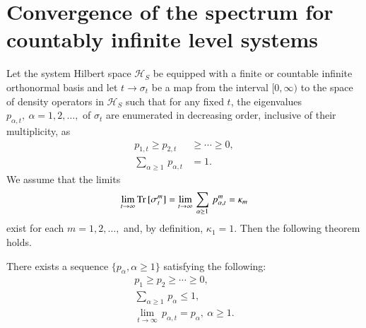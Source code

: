 \section{Convergence of the spectrum for countably infinite level systems}\label{chap8-sec9}

Let the system Hilbert space $\mathcal{H}_S$ be equipped with a finite or countable infinite orthonormal basis and let 
$t\rightarrow \sigma_t$ be a map from the interval $[0,\infty)$ to the space of density operators in $\mathcal{H}_S$ such that for any fixed  $t$, the eigenvalues $p_{\alpha, t},\ \alpha=1,2,\ldots,$  of  
$\sigma_t$ are enumerated in decreasing order, inclusive of their multiplicity, as   
\begin{align} 
p_{1,t}\geq p_{2,t}& \geq \cdots \geq 0, \label{chap8-eq9.1}\\
\sum_{\alpha\geq 1}\, p_{\alpha, t}& =1.\label{chap8-eq9.2}
\end{align}
We assume that the limits
\begin{equation}
	\underset{t\rightarrow\infty}{\lim}\, {\rm Tr}\,[\sigma_t^m]=\underset{t\rightarrow\infty}{\lim}\, \sum_{\alpha\geq 1}\, p_{\alpha, t}^m=\kappa_m \label{chap8-eq9.3}
\end{equation} 
exist for each $m=1,2,\ldots,$ and, by definition,  $\kappa_1=1$.  Then the following theorem holds.

\begin{thm} \label{chap8-thm5}
There exists a sequence $\{p_\alpha, \alpha\geq 1\}$ satisfying the following: 
\begin{gather}
	p_1\geq p_2 \geq \cdots \geq 0, \label{chap8-eq9.4}\\
	\sum_{\alpha\geq 1}\, p_{\alpha}\leq 1, \label{chap8-eq9.5}\\
	\underset{t\rightarrow\infty}{\lim}\,p_{\alpha,t}=p_\alpha,\ \alpha\geq 1.\label{chap8-eq9.6}
\end{gather}
\end{thm}

